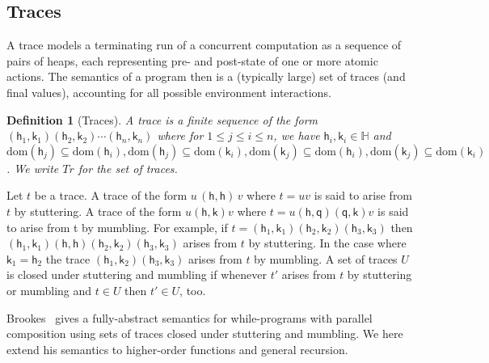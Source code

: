 \documentclass[nocopyrightspace,preprint]{sigplanconf}
\newcommand{\dom}[1]{\mathrm{dom}({#1})}
\newcommand{\Stores}{\ensuremath{\mathbb{H}}}
\newtheorem{definition}[theorem]{Definition}
\newcommand\heap{\ensuremath{\mathsf{h}}\xspace}
\newcommand\h{\heap}
\renewcommand\k{\ensuremath{\mathsf{k}}\xspace}
\newcommand\heapp{\ensuremath{\mathsf{q}}}
\begin{document}
\subsection{Traces}
A trace models a terminating run of a concurrent computation as
a sequence of pairs of heaps, each representing
pre- and post-state of one or more atomic actions. The semantics of a
program then is a (typically large) set of traces (and
final values), accounting
for all possible environment interactions. 


\begin{definition}[Traces]
A trace is a finite sequence of the form $(\h_1,\k_1) (\h_2,\k_2) \cdots (\h_n,\k_n) $ where for $1 \leq j \leq i \leq n$, we have $\h_i,\k_i \in\Stores$  and $\dom{\h_j} \subseteq \dom{\h_i}, \dom{\h_j} \subseteq \dom{\k_i}, \dom{\k_j} \subseteq \dom{\h_i}, \dom{\k_j} \subseteq \dom{\k_i}$. We write $\textit{Tr}$ for the set of traces. 
\end{definition}

Let $ t$ be a trace. A trace of the form $u\,(\h,\h)\,v$ where $ t= u v$ is said to
arise from $t$ by stuttering. A trace of the form $u(\h,\k)v$ where
$t=u(\h,\heapp)(\heapp,\k)v$ is said to arise from t by mumbling. For example, if
$t=(\h_1,\k_1)(\h_2,\k_2)(\h_3,\k_3)$ then $(\h_1,\k_1)(\h,\h)(\h_2,\k_2)(\h_3,\k_3)$ 
arises from $t$
by stuttering. In the case where $\k_1=\h_2$ the trace $(\h_1,\k_2)(\h_3,\k_3)$
arises from $t$ by mumbling. A set of traces $U$ is closed under stuttering and
mumbling if whenever $t'$ arises from $t$ by stuttering or mumbling and
$t\in U$ then $t'\in U$, too. 

Brookes~\cite{brookes96ic} gives a fully-abstract semantics for while-programs
with parallel composition using sets of traces closed under stuttering
and mumbling. We here extend his semantics to higher-order functions
and general recursion.
\end{document}
